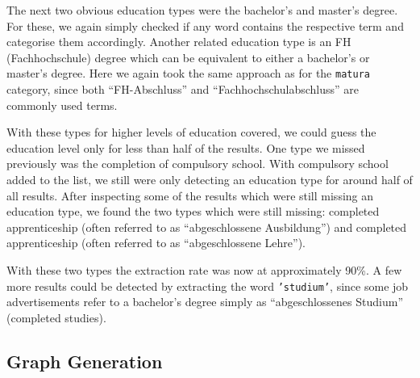 \documentclass[runningheads]{llncs}
\begin{document}
The next two obvious education types were the bachelor's and master's degree. For these, we again simply checked if any word contains the respective term and categorise them accordingly. Another related education type is an FH (Fachhochschule) degree which can be equivalent to either a bachelor's or master's degree. Here we again took the same approach as for the \texttt{matura} category, since both “FH-Abschluss” and “Fachhochschulabschluss” are commonly used terms.

With these types for higher levels of education covered, we could guess the education level only for less than half of the results. One type we missed previously was the completion of compulsory school. With compulsory school added to the list, we still were only detecting an education type for around half of all results. After inspecting some of the results which were still missing an education type, we found the two types which were still missing: completed apprenticeship (often referred to as “abgeschlossene Ausbildung”) and completed apprenticeship (often referred to as “abgeschlossene Lehre”).

With these two types the extraction rate was now at approximately 90\%. A few more results could be detected by extracting the word \texttt{'studium'}, since some job advertisements refer to a bachelor's degree simply as “abgeschlossenes Studium” (completed studies).

\subsection{Graph Generation}
\label{sub:graph_generation}

\newpage
\printbibliography
\end{document}
